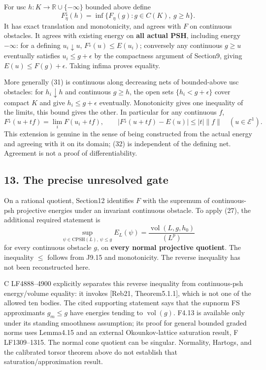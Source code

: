 \documentclass[
  11pt,
]{article}
\begin{document}
For usc \(h:K\to\mathbb R\cup\{-\infty\}\) bounded above define
\[ F_\eta^\downarrow(h)=\inf\{F_\eta(g):g\in C(K),\ g\geq h\}.            \tag{31}\]
It has exact translation and monotonicity, and agrees with \(F\) on
continuous obstacles. It agrees with existing energy on \textbf{all
actual PSH}, including energy \(-\infty\): for a defining
\(u_i\downarrow u\), \(F^\downarrow(u)\leq E(u_i)\); conversely any
continuous \(g\geq u\) eventually satisfies \(u_i\leq g+\epsilon\) by
the compactness argument of Section9, giving \(E(u)\leq F(g)+\epsilon\).
Taking infima proves equality.

More generally (31) is continuous along decreasing nets of bounded-above
usc obstacles: for \(h_i\downarrow h\) and continuous \(g\geq h\), the
open sets \(\{h_i<g+\epsilon\}\) cover compact \(K\) and give
\(h_i\leq g+\epsilon\) eventually. Monotonicity gives one inequality of
the limits, this bound gives the other. In particular for any continuous
\(f\), \[ F^\downarrow(u+tf)=\lim_iF(u_i+tf),\qquad
 |F^\downarrow(u+tf)-E(u)|\leq |t|\|f\|\quad(u\in\mathcal E^1).          \tag{32}\]
This extension is genuine in the sense of being constructed from the
actual energy and agreeing with it on its domain; (32) is independent of
the defining net. Agreement is not a proof of differentiability.

\subsection{13. The precise unresolved
gate}\label{the-precise-unresolved-gate}

On a rational quotient, Section12 identifies \(F\) with the supremum of
continuous-psh projective energies under an invariant continuous
obstacle. To apply (27), the additional required statement is
\[ \sup_{\psi\in\mathrm{CPSH}(L),\ \psi\leq g} E_L(\psi)
       =\frac{\operatorname{vol}(L,g,h_0)}{(L^p)}                       \tag{33}\]
for every continuous obstacle \(g\), on \textbf{every normal projective
quotient}. The inequality \(\leq\) follows from J9.15 and monotonicity.
The reverse inequality has not been reconstructed here.

C LF4888--4900 explicitly separates this reverse inequality from
continuous-psh energy/volume equality: it invokes {[}Reb21,
Theorem5.1.1{]}, which is not one of the allowed ten bodies. The cited
supporting statement says that the supnorm FS approximants \(g_m\leq g\)
have energies tending to \(\operatorname{vol}(g)\). F4.13 is available
only under its standing smoothness assumption; its proof for general
bounded graded norms uses Lemma4.15 and an external Okounkov-lattice
saturation result, F LF1309--1315. The normal cone quotient can be
singular. Normality, Hartogs, and the calibrated torsor theorem above do
not establish that saturation/approximation result.
\end{document}
